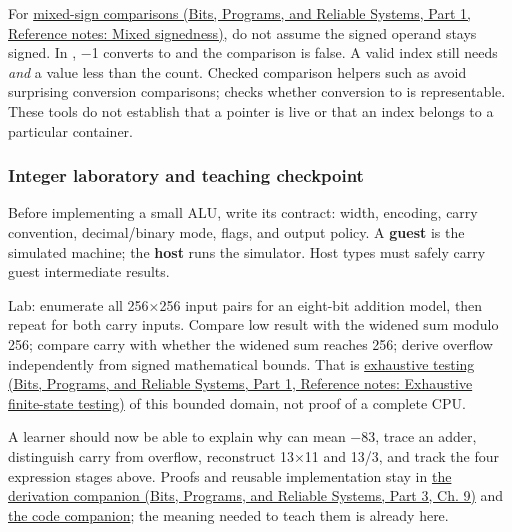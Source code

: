 For \href{../01-Bits-Programs-and-Reliable-Systems-P01/main.pdf\#nameddest=appendix-736a2345de4a}{mixed-sign comparisons (Bits, Programs, and Reliable Systems, Part 1, Reference notes: Mixed signedness)}, do not assume the signed operand stays signed. In , −1 converts to  and the comparison is false. A valid index still needs  \emph{and} a value less than the count. Checked comparison helpers such as  avoid surprising conversion comparisons;  checks whether conversion to  is representable. These tools do not establish that a pointer is live or that an index belongs to a particular container.

\subsubsection{Integer laboratory and teaching checkpoint}\label{05-engine-i-ch001-integer-laboratory-and-teaching-checkpoint}

\hypertarget{05-engine-i-ch001-integer-laboratory-and-teaching-checkpoint}{}

Before implementing a small ALU, write its contract: width, encoding, carry convention, decimal/binary mode, flags, and output policy. A \textbf{guest} is the simulated machine; the \textbf{host} runs the simulator. Host types must safely carry guest intermediate results.

Lab: enumerate all 256×256 input pairs for an eight-bit addition model, then repeat for both carry inputs. Compare low result with the widened sum modulo 256; compare carry with whether the widened sum reaches 256; derive overflow independently from signed mathematical bounds. That is \href{../01-Bits-Programs-and-Reliable-Systems-P01/main.pdf\#nameddest=appendix-05db24ccc28a}{exhaustive testing (Bits, Programs, and Reliable Systems, Part 1, Reference notes: Exhaustive finite-state testing)} of this bounded domain, not proof of a complete CPU.

A learner should now be able to explain why  can mean −83, trace an adder, distinguish carry from overflow, reconstruct 13×11 and 13/3, and track the four expression stages above. Proofs and reusable implementation stay in \href{../01-Bits-Programs-and-Reliable-Systems-P03/main.pdf\#nameddest=01-foundations-i-ch011-m002---signed-representations-adders-and-arithmetic-policies}{the derivation companion (Bits, Programs, and Reliable Systems, Part 3, Ch. 9)} and \hyperref[appendix-4e2236f53445-m002---exhaustive-8-bit-addition-oracle-and-saturation]{the code companion}; the meaning needed to teach them is already here.

